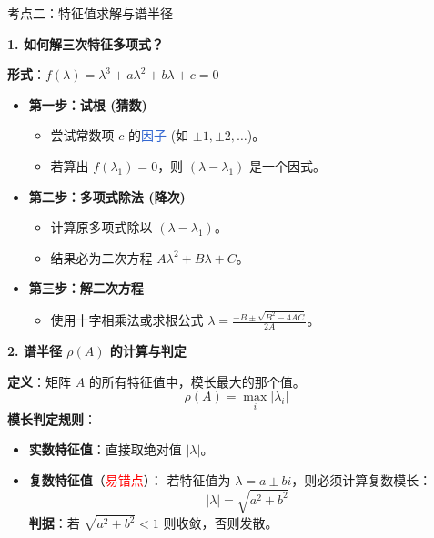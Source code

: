 \documentclass[12pt, a4paper]{article}
\begin{document}
\vspace{1em}
\begin{knowpoint}{考点二：特征值求解与谱半径}

    \textbf{\large 1. 如何解三次特征多项式？}
    \par \vspace{0.3em}
    \textbf{形式}：$f(\lambda) = \lambda^3 + a\lambda^2 + b\lambda + c = 0$
    \begin{itemize}
        \item \textbf{第一步：试根 (猜数)}
        \begin{itemize}
            \item 尝试常数项 $c$ 的\textcolor{highlight}{因子} (如 $\pm 1, \pm 2, \dots$)。
            \item 若算出 $f(\lambda_1)=0$，则 $(\lambda - \lambda_1)$ 是一个因式。
        \end{itemize}
        \item \textbf{第二步：多项式除法 (降次)}
        \begin{itemize}
            \item 计算原多项式除以 $(\lambda - \lambda_1)$。
            \item 结果必为二次方程 $A\lambda^2 + B\lambda + C$。
        \end{itemize}
        \item \textbf{第三步：解二次方程}
        \begin{itemize}
            \item 使用十字相乘法或求根公式 $\lambda = \frac{-B \pm \sqrt{B^2-4AC}}{2A}$。
        \end{itemize}
    \end{itemize}

    \vspace{1em} %

    \textbf{\large 2. 谱半径 $\rho(A)$ 的计算与判定}
    \vspace{0.3em}
    \begin{tcolorbox}[colback=blue!5!white, colframe=blue!20!white, size=small]
        \textbf{定义}：矩阵 $A$ 的所有特征值中，模长最大的那个值。
        \[ \rho(A) = \max_{i} |\lambda_i| \]
        \textbf{模长判定规则}：
        \begin{itemize}
            \item \textbf{实数特征值}：直接取绝对值 $|\lambda|$。
            \item \textbf{复数特征值}（\textcolor{red}{易错点}）：
            若特征值为 $\lambda = a \pm bi$，则必须计算复数模长：
            \[ |\lambda| = \sqrt{a^2 + b^2} \]
            \textbf{判据}：若 $\sqrt{a^2 + b^2} < 1$ 则收敛，否则发散。
        \end{itemize}
    \end{tcolorbox}


\end{knowpoint}
\end{document}
